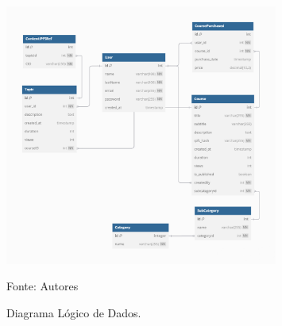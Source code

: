 \begin{apendicesenv}
    \begin{figure}[h]
        \centering
        \caption{Diagrama Lógico de Dados.}
        \includegraphics[width=0.8\textwidth]{figuras/ddl.png}
        \begin{center}
            {\footnotesize Fonte: Autores}
        \end{center}
        \label{fig:dld}
    \end{figure}


\end{apendicesenv}
